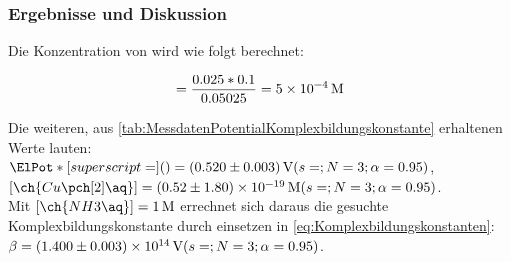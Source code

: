 \documentclass{article}
\begin{document}
        \subsubsection{Ergebnisse und Diskussion}
        
        Die Konzentration von \ch{[Cu(NH3)4]\pch[2]\aq} wird wie folgt berechnet:
        
        \begin{equation}
          [\ch{[Cu(NH3)4]\pch[2]\aq}] = \frac{0.025 * 0.1}{0.05025} = \SI[mode=text]{5d-4}{M}
        \end{equation}
        
        Die weiteren, aus \ref{tab:MessdatenPotentialKomplexbildungskonstante} erhaltenen Werte lauten: $\ElPot*[superscript=](){} = \SI[mode=text, separate-uncertainty]{0.52 \pm 0.003}{V} (s=;N=3;\alpha=0.95)$, $[\ch{Cu\pch[2]\aq}] = \SI[mode=text, separate-uncertainty]{0.52 \pm 1.8d-19}{M} (s=;N=3;\alpha=0.95)$. \\
        
        Mit $[\ch{NH3\aq}] = \SI[mode=text]{1}{M}$ errechnet sich daraus die gesuchte Komplexbildungskonstante durch einsetzen in \eqref{eq:Komplexbildungskonstanten}: $\beta = \SI[mode=text, separate-uncertainty]{1.4 \pm 0.003d14}{V} (s=;N=3;\alpha=0.95)$.
        
  \pagebreak
  
  \listofreactions
  \printbibliography[title=Literaturverzeichnis]
  \listoffigures
  \listoftables
  
\end{document}
